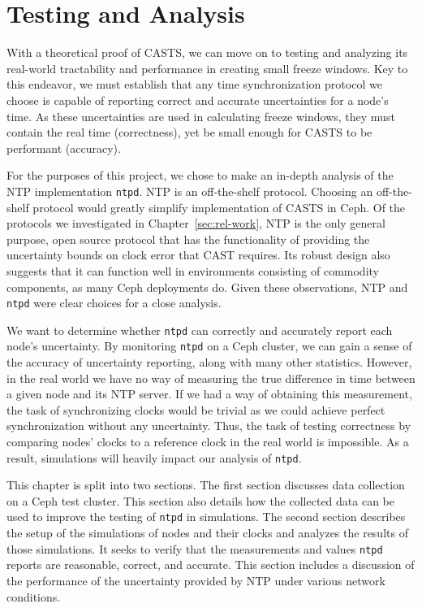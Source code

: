 \chapter{Testing and Analysis}
\label{sec:results}


With a theoretical proof of CASTS, we can move on to testing
and analyzing its real-world tractability and performance in creating
small freeze windows.  Key to
this endeavor, we must establish that any time synchronization
protocol we choose is capable of reporting correct and accurate
uncertainties for a node's time. As these uncertainties are used in
calculating freeze windows, they must contain the real time
(correctness), yet be small enough for CASTS to be performant
(accuracy).

For the purposes of this project, we chose to make an in-depth
analysis of the NTP implementation \texttt{ntpd}. NTP is an
off-the-shelf protocol. Choosing an off-the-shelf protocol would
greatly simplify implementation of CASTS in Ceph. Of the
protocols we investigated in Chapter~\ref{sec:rel-work}, NTP is the
only general purpose, open source protocol that has the
functionality of providing the uncertainty bounds on clock error 
that CAST requires. Its robust
design also suggests that it can function well in environments
consisting of commodity components, as many Ceph deployments do. 
Given these observations, NTP and \texttt{ntpd} were
clear choices for a close analysis.

We want to determine whether \texttt{ntpd} can correctly and
accurately report each node's uncertainty. By monitoring \texttt{ntpd}
on a Ceph cluster, we can gain a sense of the accuracy of uncertainty
reporting, along with many other statistics. However, in the real
world we have no way of measuring the true difference in time
between a given node and its NTP server. If we had a way of obtaining
this measurement, the task of synchronizing clocks would be trivial
as we could achieve perfect synchronization without any uncertainty.
Thus, the task of testing correctness by comparing nodes' clocks to a
reference clock in the real
world is impossible. As a result, simulations will heavily impact
our analysis of \texttt{ntpd}.

This chapter is split into two sections. The first section discusses
data collection on a Ceph test cluster. This section also details how
the collected data can be used to improve the testing of \texttt{ntpd}
in simulations.  The second section describes the setup of the
simulations of nodes and their clocks and analyzes the results of those
simulations. It seeks to verify that the measurements and values
\texttt{ntpd} reports are reasonable, correct, and accurate. This
section includes a discussion of the performance of the uncertainty
provided by NTP under various network
conditions.

